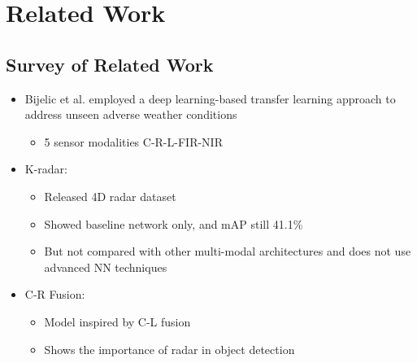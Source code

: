 \documentclass[rnd]{mas_proposal}
\begin{document}
\section{Related Work}

\subsection{Survey of Related Work}
\begin{itemize}
    \item Bijelic et al. employed a deep learning-based transfer learning approach to address unseen adverse weather conditions
    \cite{bijelic2020seeing}
    \begin{itemize}
        \item 5 sensor modalities C-R-L-FIR-NIR
    \end{itemize}
    
    \item K-radar: 
    \cite{Paek2022Jun}
    \begin{itemize}
        \item Released 4D radar dataset
        \item Showed baseline network only, and mAP still 41.1\%
        \item But not compared with other multi-modal architectures and does not use advanced NN techniques 
    \end{itemize}
        
    
    \item C-R Fusion:
    \cite{Nobis2020May}
    \begin{itemize}
        \item Model inspired by C-L fusion
        \item Shows the importance of radar in object detection
    \end{itemize}    
    
    
\end{itemize}
\end{document}
